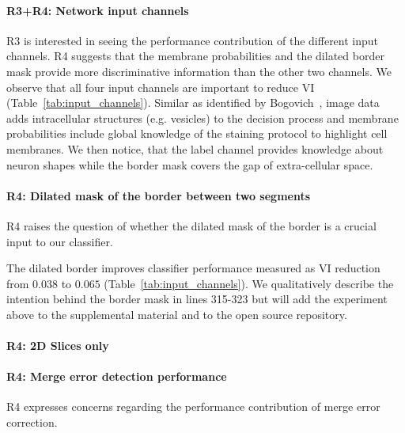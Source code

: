 \documentclass[10pt,twocolumn,letterpaper]{article}
\begin{document}
\paragraph{R3+R4: Network input channels} R3 is interested in seeing the performance contribution of the different input channels. R4 suggests that the membrane probabilities and the dilated border mask provide more discriminative information than the other two channels. We observe that all four input channels are important to reduce VI (Table~\ref{tab:input_channels}). Similar as identified by Bogovich~\etal, image data adds intracellular structures (e.g. vesicles) to the decision process and membrane probabilities include global knowledge of the staining protocol to highlight cell membranes. We then notice, that the label channel provides knowledge about neuron shapes while the border mask covers the gap of extra-cellular space.

\begin{table}[h]
\caption{We evaluate automatic selection on the AC4 subvolume ($p_t=0.95$) using the GP classifier with different input channels and report median VI reduction. The combination of all four channels performs best.}
\label{tab:input_channels}
\end{table}

\paragraph{R4: Dilated mask of the border between two segments} R4 raises the question of whether the dilated mask of the border is a crucial input to our classifier. 


The dilated border improves classifier performance measured as VI reduction from $0.038$ to $0.065$ (Table~\ref{tab:input_channels}). We qualitatively describe the intention behind the border mask in lines 315-323 but will add the experiment above to the supplemental material and to the open source repository.

\paragraph{R4: 2D Slices only}

\paragraph{R4: Merge error detection performance} R4 expresses concerns regarding the performance contribution of merge error correction. 





{\small


}
\end{document}
